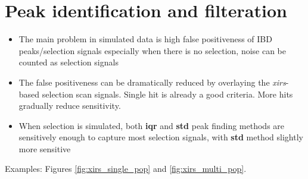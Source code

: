 \documentclass[11pt]{article}
\begin{document}
\section {Peak identification and filteration}
\begin{itemize}[noitemsep,topsep=0pt]
	\item The main problem in simulated data is high false positiveness of IBD peaks/selection signals
	      especially when there is no selection, noise can be counted as selection signals
	\item The false positiveness can be dramatically reduced by
	      overlaying the \textit{xirs}-based selection scan signals.
	      Single hit is already a good criteria. More hits gradually reduce sensitivity.
	\item When selection is simulated, both \textbf{iqr} and \textbf{std} peak finding methods
	      are sensitively enough to capture most selection signals, with \textbf{std} method slightly
	      more sensitive
\end{itemize}

Examples: Figures \ref{fig:xirs_single_pop} and \ref{fig:xirs_multi_pop}.
\end{document}
